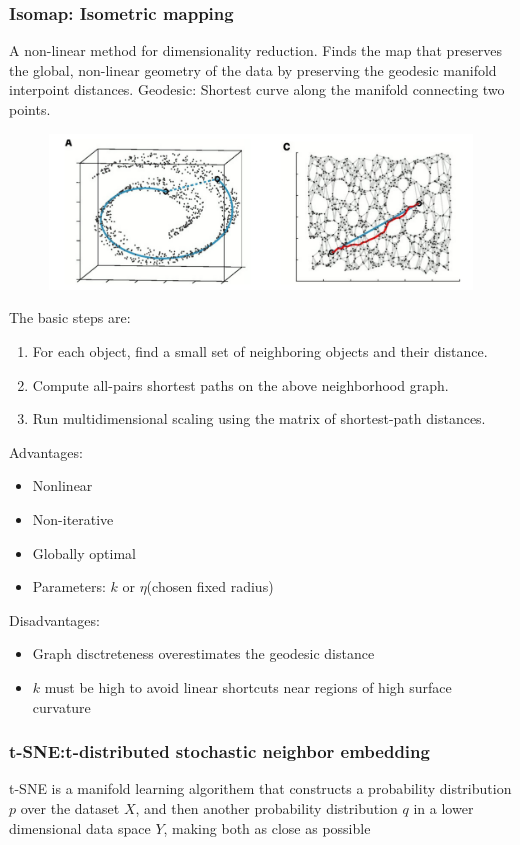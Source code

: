 \subsubsection{Isomap: Isometric mapping}
A non-linear method for dimensionality reduction.
Finds the map that preserves the global, non-linear geometry of the data by preserving the geodesic manifold interpoint distances.
Geodesic: Shortest curve along the manifold connecting two points.
\begin{figure}[!h]
    \includegraphics[width = \columnwidth]{figures/10/Isomap.png}
\end{figure}

The basic steps are:
\begin{enumerate}
    \item For each object, find a small set of neighboring objects and their distance.
    \item Compute all-pairs shortest paths on the above neighborhood graph.
    \item Run multidimensional scaling using the matrix of shortest-path distances.
\end{enumerate}
Advantages:
\begin{itemize}
    \item Nonlinear
    \item Non-iterative
    \item Globally optimal
    \item Parameters: \(k\) or \(\eta\)(chosen fixed radius)
\end{itemize}
Disadvantages:
\begin{itemize}
    \item Graph disctreteness overestimates the geodesic distance
    \item  \(k\) must be high to avoid linear shortcuts near regions of high surface curvature
\end{itemize}
\subsubsection{t-SNE:t-distributed stochastic neighbor embedding}
t-SNE is a manifold learning algorithem that constructs a probability distribution \(p\) over the dataset \(X\), and then another probability distribution \(q\) in a lower dimensional data space \(Y\), making both as close as possible

